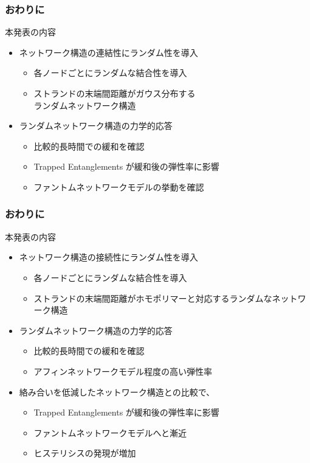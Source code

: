\documentclass[12pt, dvipdfmx]{beamer}
\begin{document}
\begin{frame}
	\frametitle{おわりに}
		\begin{block}{本発表の内容}
			\begin{itemize}
			\item ネットワーク構造の連結性にランダム性を導入
				\begin{itemize}
					\item 各ノードごとにランダムな結合性を導入
					\item ストランドの末端間距離がガウス分布する\\ランダムネットワーク構造
				\end{itemize}
			\item ランダムネットワーク構造の力学的応答
				\begin{itemize}
					\item 比較的長時間での緩和を確認
					\item Trapped Entanglements が緩和後の弾性率に影響 
					\item ファントムネットワークモデルの挙動を確認
				\end{itemize}
			\end{itemize}
		\end{block}
\end{frame}


\begin{frame}
	\frametitle{おわりに}
		\begin{block}{本発表の内容}
			\begin{itemize}
			\item ネットワーク構造の接続性にランダム性を導入
				\begin{itemize}
					\item 各ノードごとにランダムな結合性を導入
					\item ストランドの末端間距離がホモポリマーと対応するランダムなネットワーク構造
				\end{itemize}
			\item ランダムネットワーク構造の力学的応答
				\begin{itemize}
					\item 比較的長時間での緩和を確認
					\item アフィンネットワークモデル程度の高い弾性率
				\end{itemize}
			\item 絡み合いを低減したネットワーク構造との比較で、
				\begin{itemize}
					\item Trapped Entanglements が緩和後の弾性率に影響 
					\item ファントムネットワークモデルへと漸近
					\item ヒステリシスの発現が増加
				\end{itemize}
			\end{itemize}
		\end{block}
\end{frame}
\end{document}
